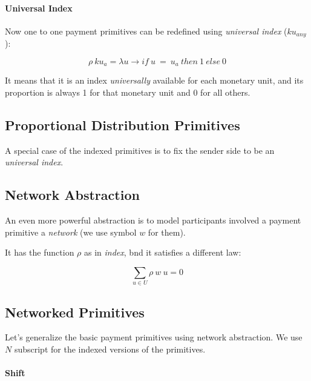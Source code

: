 \paragraph{Universal Index}

Now one to one payment primitives can be redefined using \textit{universal index} ($ku_{any}$):

\begin{equation}
    \rho\ ku_{a} = \lambda u \rightarrow if\ u\ =\ u_a\ then\ 1\ else\ 0
\end{equation}

It means that it is an index \textit{universally} available for each monetary unit, and its proportion is always 1 for
that monetary unit and 0 for all others.

\subsection{Proportional Distribution Primitives}

A special case of the indexed primitives is to fix the sender side to be an \textit{universal index}.


\subsection{Network Abstraction}

An even more powerful abstraction is to model participants involved a payment primitive a \textit{network} (we use
symbol $w$ for them).

It has the function $\rho$ as in \textit{index}, bnd it satisfies a different law:

\begin{equation}
    \displaystyle \sum_{u \in U} \rho\ w\ u = 0
\end{equation}

\subsection{Networked Primitives}

Let's generalize the basic payment primitives using network abstraction. We use $N$ subscript for the indexed versions
of the primitives.

\paragraph{Shift}


